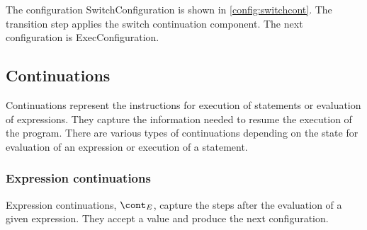 \documentclass{article}
\begin{document}
The configuration SwitchConfiguration is shown in \ref{config:switchcont}.
The transition step applies the switch continuation component.
The next configuration is ExecConfiguration.

\subsection{Continuations}
\label{subsec:continuations-definition}

\newcommand{\expressionmeta}{\ensuremath{\mathit{E}}}
\newcommand{\expressionsmeta}{\expressionmeta{s}}
\newcommand{\variablemeta}{\ensuremath{\mathit{X}}}
\newcommand{\boolmeta}{\ensuremath{\mathit{B}}}
\newcommand{\integermeta}{\ensuremath{\mathit{I}}}
\newcommand{\doublemeta}{\ensuremath{\mathit{D}}}
\newcommand{\stringmeta}{\ensuremath{\mathit{S}}}
\newcommand{\idmeta}{\ensuremath{\mathit{X}}}
\newcommand{\membermeta}{\ensuremath{\mathit{M}}}
\newcommand{\typemeta}{\ensuremath{\mathit{T}}}
\newcommand{\statementmeta}{\ensuremath{\mathit{\stmt}}}
\newcommand{\labelmeta}{\ensuremath{\mathit{\tt{L}}}}

Continuations represent the instructions for execution of statements or evaluation of expressions.
They capture the information needed to resume the execution of the program.
There are various types of continuations depending on the state for evaluation of an expression or execution of a statement.
\subsubsection{Expression continuations}
\label{subsubsec:expression-continuations}

Expression continuations, $\econt$, capture the steps after the evaluation of a given expression.
They accept a value and produce the next configuration.
\end{document}

